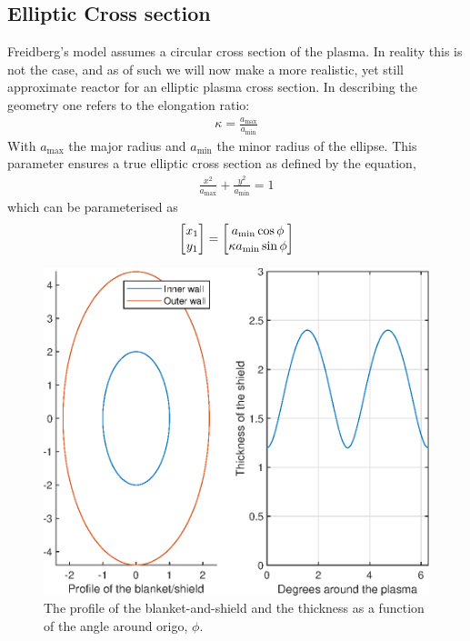 \subsection{Elliptic Cross section}
Freidberg's model assumes a circular cross section of the plasma. In reality this is not the case, and as of such we will now make a more realistic, yet still approximate reactor for an elliptic plasma cross section.
In describing the geometry one refers to the elongation ratio:
\begin{align}
	\kappa = \frac{a_{\max}}{a_{\min}}
\end{align}
With $a_{\max}$ the major radius and $a_{\min}$ the minor radius of the ellipse. This parameter ensures a true elliptic cross section as defined by the equation,
\begin{align}
	\frac{x^2}{a_{\max}}+\frac{y^2}{a_{\min}} = 1
\end{align}
which can be parameterised as
\begin{align}
	\mqty[x_1 \\y_1] &= \mqty[a_{\min}\cos{\phi}\\\kappa a_{\min}\sin{\phi}] \\
	\label{eq:inner_ellipse}
\end{align}
\begin{figure}
	\includegraphics[width=.4\textwidth]{MatlabFigures/ShieldThickness/ShieldThickness.eps}
	\caption{The profile of the blanket-and-shield and the thickness as a function of the angle around origo, \(\phi\).}
	\label{ShTh}
\end{figure}
